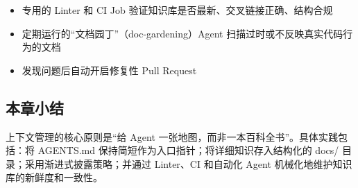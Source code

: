 \begin{itemize}[nosep]
  \item 专用的 Linter 和 CI Job 验证知识库是否最新、交叉链接正确、结构合规
  \item 定期运行的``文档园丁''（doc-gardening）Agent 扫描过时或不反映真实代码行为的文档
  \item 发现问题后自动开启修复性 Pull Request
\end{itemize}

\subsection{本章小结}

上下文管理的核心原则是``给 Agent 一张地图，而非一本百科全书''。具体实践包括：将 AGENTS.md 保持简短作为入口指针；将详细知识存入结构化的 docs/ 目录；采用渐进式披露策略；并通过 Linter、CI 和自动化 Agent 机械化地维护知识库的新鲜度和一致性。

\newpage


